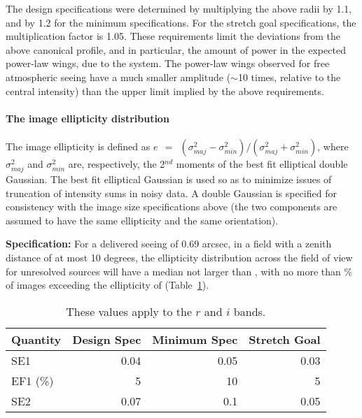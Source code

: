 The design specifications were determined by multiplying the above radii by
1.1, and by 1.2 for the minimum specifications.  For the stretch goal
specifications, the multiplication factor is 1.05.  These requirements
limit the deviations from the above canonical profile, and in particular,
the amount of power in the expected power-law wings, due to the system. The
power-law wings observed for free atmospheric seeing have a much smaller
amplitude ($\sim$10 times, relative to the central intensity) than the
upper limit implied by the above requirements.




\paragraph{The image ellipticity distribution\\}

The image ellipticity is defined as $e ~~=~~ (\sigma^{2}_{maj} -
\sigma^{2}_{min}) / (\sigma^{2}_{maj} + \sigma^{2}_{min}) $, where
$\sigma^{2}_{maj}$ and $\sigma^{2}_{min}$ are, respectively, the
2$^{nd}$ moments of the best fit elliptical double Gaussian.  The best
fit elliptical Gaussian is used so as to minimize issues of truncation
of intensity sums in noisy data.  A double Gaussian is specified for consistency
with the image size specifications above (the two components are
assumed to have the same ellipticity and the same orientation).

\textbf{Specification:} For a delivered seeing of 0.69 arcsec, in a field
with a zenith distance of at most 10 degrees, the ellipticity
distribution across the field of view for unresolved sources will have
a median not larger than
,
with no more than
\% of images exceeding the ellipticity of
(Table~\ref{TellipS}).

\begin{table}[h]
\begin{tabular}{|l|r|r|r|}
\hline
Quantity       & Design Spec & Minimum Spec & Stretch Goal \\
\hline
      SE1      &    0.04      &     0.05     &       0.03    \\
      EF1 (\%) &      5       &      10      &         5     \\
      SE2      &    0.07      &     0.1      &       0.05    \\
\hline
\end{tabular}
\caption{These values apply to the $r$ and $i$ bands.}
\label{TellipS}
\end{table}


